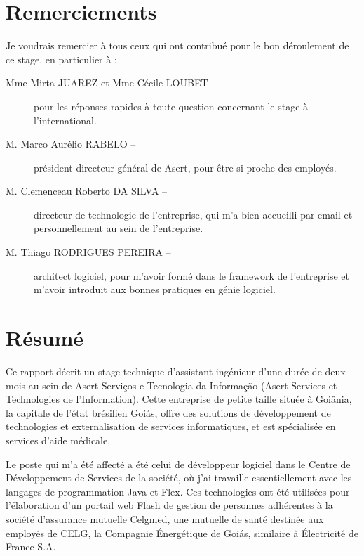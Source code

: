 \section*{Remerciements}

Je voudrais remercier à tous ceux qui ont contribué pour le bon déroulement de ce stage, en particulier à :

\vspace{1em}

\begin{description}
\item[Mme Mirta JUAREZ et Mme Cécile LOUBET --] pour les réponses rapides à toute question concernant le stage à l'international.
\item[M. Marco Aurélio RABELO --] président-directeur général de Asert, pour être si proche des employés.
\item[M. Clemenceau Roberto DA SILVA --] directeur de technologie de l'entreprise, qui m'a bien accueilli par email et personnellement au sein de l'entreprise.
\item[M. Thiago RODRIGUES PEREIRA --] architect logiciel, pour m'avoir formé dans le framework de l'entreprise et m'avoir introduit aux bonnes pratiques en génie logiciel.
\end{description}

\section*{Résumé}

Ce rapport décrit un stage technique d'assistant ingénieur d'une durée de deux mois au sein de Asert Serviços e Tecnologia da Informação (Asert Services et Technologies de l'Information). Cette entreprise de petite taille située à Goiânia, la capitale de l'état brésilien Goiás, offre des solutions de développement de technologies et externalisation de services informatiques, et est spécialisée en services d'aide médicale. 

Le poste qui m'a été affecté a été celui de développeur logiciel dans le Centre de Développement de Services de la société, où j'ai travaille essentiellement avec les langages de programmation Java et Flex. Ces technologies ont été utilisées pour l'élaboration d'un portail web Flash de gestion de personnes adhérentes à la société d'assurance mutuelle Celgmed, une mutuelle de santé destinée aux employés de CELG, la Compagnie Énergétique de Goiás, similaire à Électricité de France S.A.

